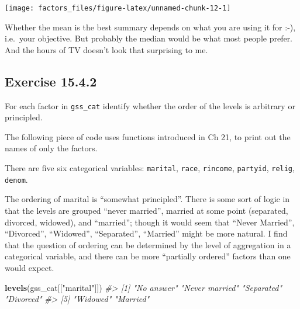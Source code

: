 \documentclass[]{book}
\newenvironment{Shaded}{\begin{snugshade}}{\end{snugshade}}
\newcommand{\CommentTok}[1]{\textcolor[rgb]{0.56,0.35,0.01}{\textit{#1}}}
\newcommand{\KeywordTok}[1]{\textcolor[rgb]{0.13,0.29,0.53}{\textbf{#1}}}
\newcommand{\NormalTok}[1]{#1}
\newcommand{\OperatorTok}[1]{\textcolor[rgb]{0.81,0.36,0.00}{\textbf{#1}}}
\newcommand{\StringTok}[1]{\textcolor[rgb]{0.31,0.60,0.02}{#1}}
\theoremstyle{plain}
\theoremstyle{remark}
\begin{document}
\begin{center}\texttt{[image: factors\_files/figure-latex/unnamed-chunk-12-1]} \end{center}

Whether the mean is the best summary depends on what you are using it
for :-), i.e.~your objective. But probably the median would be what most
people prefer. And the hours of TV doesn't look that surprising to me.

\hypertarget{exercise-15.4.2}{%
\subsection*{\texorpdfstring{Exercise
{15.4.2}}{Exercise 15.4.2}}\label{exercise-15.4.2}}

For each factor in \texttt{gss\_cat} identify whether the order of the
levels is arbitrary or principled.

The following piece of code uses functions introduced in Ch 21, to print
out the names of only the factors.

\begin{Shaded}
\end{Shaded}

There are five six categorical variables: \texttt{marital},
\texttt{race}, \texttt{rincome}, \texttt{partyid}, \texttt{relig},
\texttt{denom}.

The ordering of marital is ``somewhat principled''. There is some sort
of logic in that the levels are grouped ``never married'', married at
some point (separated, divorced, widowed), and ``married''; though it
would seem that ``Never Married'', ``Divorced'', ``Widowed'',
``Separated'', ``Married'' might be more natural. I find that the
question of ordering can be determined by the level of aggregation in a
categorical variable, and there can be more ``partially ordered''
factors than one would expect.

\begin{Shaded}
\begin{Highlighting}[]
\KeywordTok{levels}\NormalTok{(gss_cat[[}\StringTok{"marital"}\NormalTok{]])}
\CommentTok{#> [1] "No answer"     "Never married" "Separated"     "Divorced"     }
\CommentTok{#> [5] "Widowed"       "Married"}
\end{Highlighting}
\end{Shaded}
\end{document}
